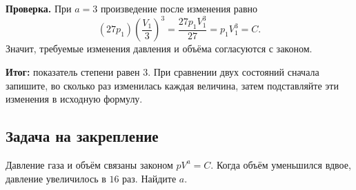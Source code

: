 \documentclass[a4paper,11pt]{article}
\begin{document}
\textbf{Проверка.} При $a=3$ произведение после изменения равно
\[
 (27p_1)\left(\frac{V_1}{3}\right)^3
 =\frac{27p_1V_1^3}{27}=p_1V_1^3=C.
\]
Значит, требуемые изменения давления и объёма согласуются с законом.

\textcolor{teal!60!black}{\textbf{Итог:}} показатель степени равен $\boxed{3}$. При сравнении двух состояний сначала запишите, во сколько раз изменилась каждая величина, затем подставляйте эти изменения в исходную формулу.

\subsection*{Задача на закрепление}
Давление газа и объём связаны законом $pV^a=C$. Когда объём уменьшился вдвое, давление увеличилось в $16$ раз. Найдите $a$.
\end{document}
